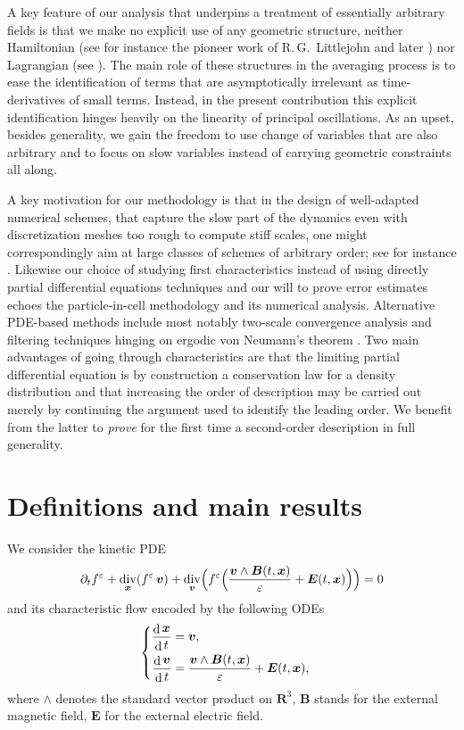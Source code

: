 \documentclass[JEP,XML,SOM,Unicode]{cedram}
\newenvironment{splitcases}
{\begin{cases}\begin{aligned}}
{\end{aligned}\end{cases}}
\let\eps\varepsilon
\let\d\partial
\DeclareMathOperator\dD{d}\let\dd\dD
\DeclareMathOperator{\Div}{div}
\theoremstyle{plain}
\theoremstyle{definition}
\newcommand{\be}{\begin{equation}}
\newcommand{\ee}{\end{equation}}
\newcommand\R{\mathbf R}
\newcommand\bB{{\boldsymbol B}}
\newcommand\bE{{\boldsymbol E}}
\newcommand\bfv{{\boldsymbol v}}
\newcommand\bfx{{\boldsymbol x}}
\begin{document}
A key feature of our analysis that underpins a treatment of
essentially arbitrary fields is that we make no explicit use of any
geometric structure, neither Hamiltonian (see for instance the pioneer
work of R.\,G.\ Littlejohn \cite{littleJ1, littleJ2, littleJ3} and later
\cite{Benettin-Sempio,FrenodLutz_geometrical_gyro-kinetic}) nor Lagrangian (see \cite{Possanner}). The main role of these structures in the averaging process is to ease the identification of terms that are asymptotically irrelevant as time-derivatives of small terms. Instead, in the present contribution this explicit identification hinges heavily on the linearity of principal oscillations. As an upset, besides generality, we gain the freedom to use change of variables that are also arbitrary and to focus on slow variables instead of carrying geometric constraints all along.

A key motivation for our methodology is that in the design of
well-adapted numerical schemes, that capture the slow part of the
dynamics even with discretization meshes too rough to compute stiff
scales, one might correspondingly aim at large classes of schemes of
arbitrary order; see for instance \cite{SFFOV, Lee,FR1,FR2}. Likewise our choice of studying first characteristics instead of using directly partial differential equations techniques and our will to prove error estimates echoes the particle-in-cell methodology and its numerical analysis. Alternative PDE-based methods include most notably two-scale convergence analysis \cite{fre_son_97,fre_son_98} and filtering techniques hinging on ergodic von Neumann's theorem \cite{Bostan_transport,bostan_10}. Two main advantages of going through characteristics are that the limiting partial differential equation is by construction a conservation law for a density distribution and that increasing the order of description may be carried out merely by continuing the argument used to identify the leading order. We benefit from the latter to \emph{prove} for the first time a second-order description in full generality.

\section{Definitions and main results}
\label{s:results}

We consider the kinetic PDE
\be\label{eq:vlasov}
\d_t f^\eps+\Div_\bfx(f^\eps\,\bfv)
+\Div_\bfv\Bigl(f^\eps\Bigl(\frac{\bfv\wedge \bB(t,\bfx)}{\eps}+\bE(t,\bfx)\Bigr)\Bigr)=0
\ee
and its characteristic flow encoded by the following ODEs
\be
\label{eq:xv}
\begin{splitcases}
\frac{\dD\bfx}{\dD t}&=\bfv,
\\
\frac{\dD\bfv}{\dD t}&=\frac{\bfv\wedge \bB(t,\bfx)}{\eps} +\bE(t,\bfx),
\end{splitcases}
\ee
where $\wedge$ denotes the standard vector product on $\R^3$, $\bB$ stands for the external magnetic field, $\bE$ for the external electric field.
\end{document}
